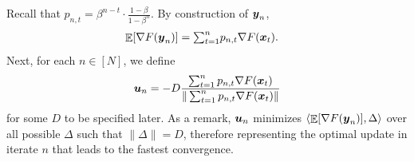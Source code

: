 

Recall that $p_{n,t} = \beta^{n-t}\cdot \frac{1-\beta}{1-\beta^n}$. By construction of ${\boldsymbol{y}}_n$,
\begin{align*}
    \mathop{\mathbb{E}}[\nabla F({\boldsymbol{y}}_n)]
    &= {\textstyle \sum}_{t=1}^n p_{n,t} \nabla F({\boldsymbol{x}}_t).
\end{align*}
Next, for each $n\in[N]$, we define
\begin{align}
    {\boldsymbol{u}}_n = -D\frac{\sum_{t=1}^n p_{n,t} \nabla F({\boldsymbol{x}}_t)}{\|\sum_{t=1}^n p_{n,t}\nabla F({\boldsymbol{x}}_t)\|}
    \label{eq:Exp-O2NC:eo2nc-u}
\end{align}
for some $D$ to be specified later. As a remark, ${\boldsymbol{u}}_n$ minimizes $\langle \mathop{\mathbb{E}}[\nabla F({\boldsymbol{y}}_n)], \Delta\rangle$ over all possible $\Delta$ such that $\|\Delta\|=D$, therefore representing the optimal update in iterate $n$ that leads to the fastest convergence.


